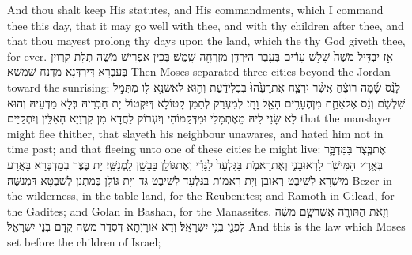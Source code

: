 {And thou shalt keep His statutes, and His commandments, which I command thee this day, that it may go well with thee, and with thy children after thee, and that thou mayest prolong thy days upon the land, which the \lord\space thy God giveth thee, for ever.}{}
{אָ֣ז יַבְדִּ֤יל מֹשֶׁה֙ שָׁלֹ֣שׁ עָרִ֔ים בְּעֵ֖בֶר הַיַּרְדֵּ֑ן מִזְרְחָ֖ה שָֽׁמֶשׁ׃}
{בְּכֵין אַפְרֵישׁ מֹשֶׁה תְּלָת קִרְוִין בְּעִבְרָא דְּיַרְדְּנָא מַדְנַח שִׁמְשָׁא׃}
{Then Moses separated three cities beyond the Jordan toward the sunrising;}{}
{לָנֻ֨ס שָׁ֜מָּה רוֹצֵ֗חַ אֲשֶׁ֨ר יִרְצַ֤ח אֶת\maqqaf רֵעֵ֙הוּ֙ בִּבְלִי\maqqaf דַ֔עַת וְה֛וּא לֹא\maqqaf שֹׂנֵ֥א ל֖וֹ מִתְּמֹ֣ל שִׁלְשֹׁ֑ם וְנָ֗ס אֶל\maqqaf אַחַ֛ת מִן\maqqaf הֶעָרִ֥ים הָאֵ֖ל וָחָֽי׃}
{לְמִעְרַק לְתַמָּן קָטוֹלָא דְּיִקְטוֹל יָת חַבְרֵיהּ בְּלָא מַדְּעֵיהּ וְהוּא לָא שָׂנֵי לֵיהּ מֵאֶתְמָלִי וּמִדְּקַמּוֹהִי וְיִעְרוֹק לַחֲדָא מִן קִרְוַיָּא הָאִלֵּין וְיִתְקַיַּים׃}
{that the manslayer might flee thither, that slayeth his neighbour unawares, and hated him not in time past; and that fleeing unto one of these cities he might live:}{}
{אֶת\maqqaf בֶּ֧צֶר בַּמִּדְבָּ֛ר בְּאֶ֥רֶץ הַמִּישֹׁ֖ר לָרֽאוּבֵנִ֑י וְאֶת\maqqaf רָאמֹ֤ת בַּגִּלְעָד֙ לַגָּדִ֔י וְאֶת\maqqaf גּוֹלָ֥ן בַּבָּשָׁ֖ן לַֽמְנַשִּֽׁי׃}
{יָת בֶּצֶר בְּמַדְבְּרָא בַּאֲרַע מֵישְׁרָא לְשֵׁיבֶט רְאוּבֵן וְיָת רָאמוֹת בַּגִּלְעָד לְשֵׁיבֶט גָּד וְיָת גּוֹלָן בְּמַתְנַן לְשִׁבְטָא דִּמְנַשֶּׁה׃}
{Bezer in the wilderness, in the table-land, for the Reubenites; and Ramoth in Gilead, for the Gadites; and Golan in Bashan, for the Manassites.}{}
{וְזֹ֖את הַתּוֹרָ֑ה אֲשֶׁר\maqqaf שָׂ֣ם מֹשֶׁ֔ה לִפְנֵ֖י בְּנֵ֥י יִשְׂרָאֵֽל׃}
{וְדָא אוֹרָיְתָא דִּסְדַר מֹשֶׁה קֳדָם בְּנֵי יִשְׂרָאֵל׃}
{And this is the law which Moses set before the children of Israel;}{}
